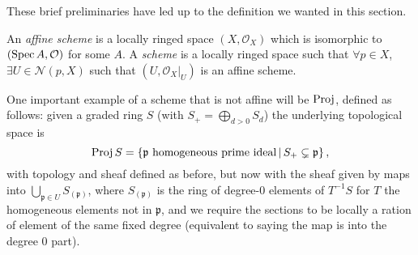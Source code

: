 \documentclass[000-main.tex]{subfiles}
\begin{document}
These brief preliminaries have led up to the definition we wanted in this section. 

\begin{definition}
  An \emph{affine scheme} is a locally ringed space $(X, \mathcal{O}_X)$ which is isomorphic to $(\operatorname{Spec} A, \mathcal{O})$ for some $A$.
  A \emph{scheme} is a locally ringed space such that $\forall p \in X$, $\exists U \in \mathcal{N}(p, X)$ such that $(U, \left . \mathcal{O}_X \right \rvert_{U})$ is an affine scheme.
\end{definition}

\begin{example}
\end{example}

One important example of a scheme that is not affine will be $\operatorname{Proj}$, defined as follows: given a graded ring $S$ (with $S_+ = \bigoplus_{d > 0 } S_d$) the underlying topological space is 
\[
  \operatorname{Proj} S = \left \lbrace \mathfrak{p} \text{ homogeneous prime ideal} \, | \, S_+ \subsetneq \mathfrak{p} \right \rbrace ,
\] 
with topology and sheaf defined as before, but now with the sheaf given by maps into $\bigcup_{\mathfrak{p} \in U} S_{(\mathfrak{p})}$, where $S_{(\mathfrak{p})}$ is the ring of degree-0 elements of $T^{-1}S$ for $T$ the homogeneous elements not in $\mathfrak{p}$, and we require the sections to be locally a ration of element of the same fixed degree (equivalent to saying the map is into the degree 0 part). 

\end{document}
